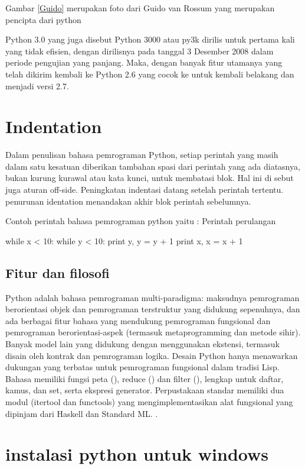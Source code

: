       Gambar \ref{Guido} merupakan foto dari Guido van Rossum yang merupakan pencipta dari python
      
      Python 3.0 yang juga disebut Python 3000 atau py3k dirilis untuk pertama kali yang tidak efisien, dengan dirilisnya pada tanggal 
      3 Desember 2008 dalam periode pengujian yang panjang. Maka, dengan banyak fitur utamanya yang telah dikirim kembali ke Python 2.6 
      yang cocok ke untuk kembali belakang dan menjadi versi 2.7. 
      
\section {Indentation}
      Dalam penulisan bahasa pemrograman Python, setiap perintah yang masih dalam satu kesatuan diberikan tambahan spasi dari 
      perintah yang ada diatasnya, bukan kurung kurawal atau kata kunci, untuk membatasi blok. Hal ini di sebut juga aturan off-side. 
      Peningkatan indentasi datang setelah perintah tertentu. penurunan identation menandakan akhir blok perintah sebelumnya.

      Contoh perintah bahasa pemrograman python yaitu :
      Perintah perulangan
	  
	  
      while x < 10: 
      	   while y < 10: 
		print y, 
		y = y + 1 
	   print x,
	   x = x + 1

      
\subsection {Fitur dan filosofi}
	Python adalah bahasa pemrograman multi-paradigma: maksudnya pemrograman berorientasi objek dan pemrograman terstruktur 
	yang didukung sepenuhnya, dan ada berbagai fitur bahasa yang mendukung pemrograman fungsional dan pemrograman berorientasi-aspek
	(termasuk metaprogramming dan metode sihir). Banyak model lain yang didukung dengan menggunakan ekstensi, termasuk disain 
	oleh kontrak dan pemrograman logika. 
	Desain Python hanya menawarkan dukungan yang terbatas untuk pemrograman fungsional dalam tradisi Lisp. 
	Bahasa memiliki fungsi peta (), reduce () dan filter (), lengkap untuk daftar, kamus, dan set, serta ekspresi generator. 
	Perpustakaan standar memiliki dua modul (itertool dan functools) yang mengimplementasikan alat fungsional yang dipinjam 
	dari Haskell dan Standard ML. \cite {van2007python}.

\section {instalasi python untuk windows}

